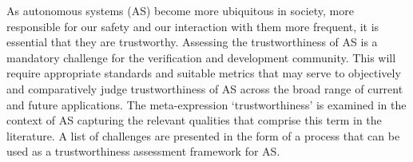 As autonomous systems (AS) become more ubiquitous in society, more responsible for our safety and our interaction with them more frequent, it is essential that they are trustworthy. Assessing the trustworthiness of AS is a mandatory challenge for the verification and development community. This will require appropriate standards and suitable metrics that may serve to objectively and comparatively judge trustworthiness of AS across the broad range of current and future applications.
%
%
The meta-expression `trustworthiness' is examined in the context of AS capturing the relevant qualities that comprise this term in the literature. 
%
A list of challenges are presented in the form of a process that can be used as a trustworthiness assessment framework for AS. 
